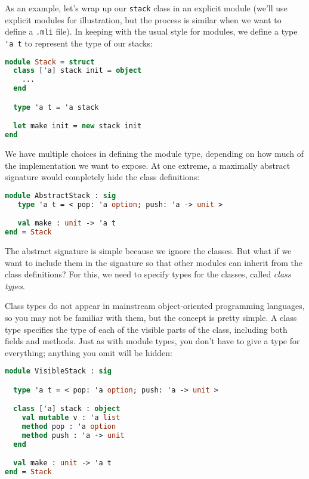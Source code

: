 As an example, let's wrap up our \passthrough{\lstinline!stack!} class
in an explicit module (we'll use explicit modules for illustration, but
the process is similar when we want to define a
\passthrough{\lstinline!.mli!} file). In keeping with the usual style
for modules, we define a type \passthrough{\lstinline!'a t!} to
represent the type of our stacks:

\begin{lstlisting}[language=Caml]
module Stack = struct
  class ['a] stack init = object
    ...
  end

  type 'a t = 'a stack

  let make init = new stack init
end
\end{lstlisting}

We have multiple choices in defining the module type, depending on how
much of the implementation we want to expose. At one extreme, a
maximally abstract signature would completely hide the class
definitions:

\begin{lstlisting}[language=Caml]
module AbstractStack : sig
   type 'a t = < pop: 'a option; push: 'a -> unit >

   val make : unit -> 'a t
end = Stack
\end{lstlisting}

The abstract signature is simple because we ignore the classes. But what
if we want to include them in the signature so that other modules can
inherit from the class definitions? For this, we need to specify types
for the classes, called \emph{class types}.

Class types do not appear in mainstream object-oriented programming
languages, so you may not be familiar with them, but the concept is
pretty simple. A class type specifies the type of each of the visible
parts of the class, including both fields and methods. Just as with
module types, you don't have to give a type for everything; anything you
omit will be hidden:

\begin{lstlisting}[language=Caml]
module VisibleStack : sig

  type 'a t = < pop: 'a option; push: 'a -> unit >

  class ['a] stack : object
    val mutable v : 'a list
    method pop : 'a option
    method push : 'a -> unit
  end

  val make : unit -> 'a t
end = Stack
\end{lstlisting}

